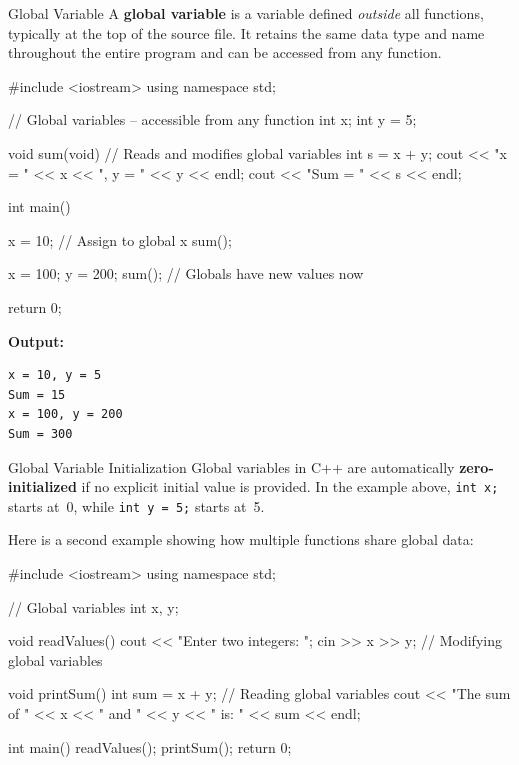 \begin{definitionbox}{Global Variable}
A \textbf{global variable} is a variable defined \emph{outside} all functions,
typically at the top of the source file. It retains the same data type and
name throughout the entire program and can be accessed from any function.
\end{definitionbox}

\begin{cppcode}
#include <iostream>
using namespace std;

// Global variables -- accessible from any function
int x;
int y = 5;

void sum(void)
{
    // Reads and modifies global variables
    int s = x + y;
    cout << "x = " << x << ", y = " << y << endl;
    cout << "Sum = " << s << endl;
}

int main()
{
    x = 10;      // Assign to global x
    sum();

    x = 100;
    y = 200;
    sum();        // Globals have new values now

    return 0;
}
\end{cppcode}

\noindent\textbf{Output:}
\begin{verbatim}
x = 10, y = 5
Sum = 15
x = 100, y = 200
Sum = 300
\end{verbatim}

\begin{importantbox}{Global Variable Initialization}
Global variables in C++ are automatically \textbf{zero-initialized} if no
explicit initial value is provided. In the example above, \texttt{int x;}
starts at~0, while \texttt{int y = 5;} starts at~5.
\end{importantbox}

Here is a second example showing how multiple functions share global data:

\begin{cppcode}
#include <iostream>
using namespace std;

// Global variables
int x, y;

void readValues()
{
    cout << "Enter two integers: ";
    cin >> x >> y;    // Modifying global variables
}

void printSum()
{
    int sum = x + y;  // Reading global variables
    cout << "The sum of " << x << " and " << y
         << " is: " << sum << endl;
}

int main()
{
    readValues();
    printSum();
    return 0;
}
\end{cppcode}

